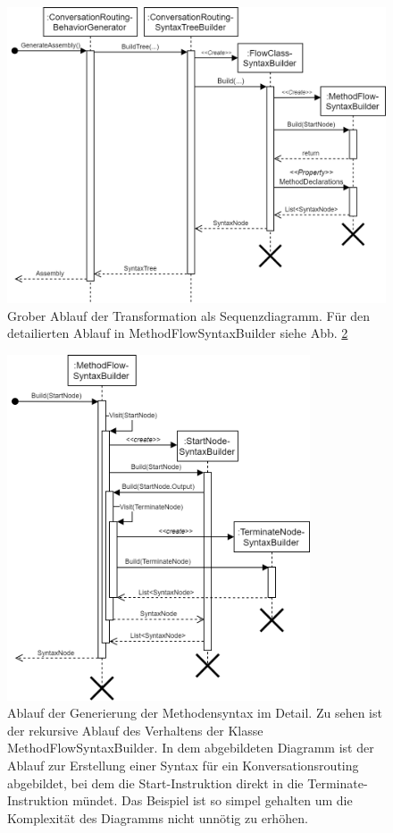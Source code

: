 \begin{figure} %
	\centering
		\includegraphics[width=\textwidth]{img/TransformationSequence.png}
	\caption[Transformatinosablauf]{Grober Ablauf der Transformation als Sequenzdiagramm. Für den detailierten Ablauf in MethodFlowSyntaxBuilder siehe Abb. \ref{fig:UML:TransformationSequenceDetail} }
	\label{fig:UML:TransformationSequence}
\end{figure}

\begin{figure} %
	\centering
		\includegraphics[width=0.8\textwidth]{img/TransformationSequenceDetail.png}
	\caption[Transformationsablauf im Detail]{Ablauf der Generierung der Methodensyntax im Detail. Zu sehen ist der rekursive Ablauf des Verhaltens der Klasse MethodFlowSyntaxBuilder. In dem abgebildeten Diagramm ist der Ablauf zur Erstellung einer Syntax für ein Konversationsrouting  abgebildet, bei dem die Start-Instruktion direkt in die Terminate-Instruktion mündet. Das Beispiel ist so simpel gehalten um die Komplexität des Diagramms nicht unnötig zu erhöhen.}
	\label{fig:UML:TransformationSequenceDetail}
\end{figure}


